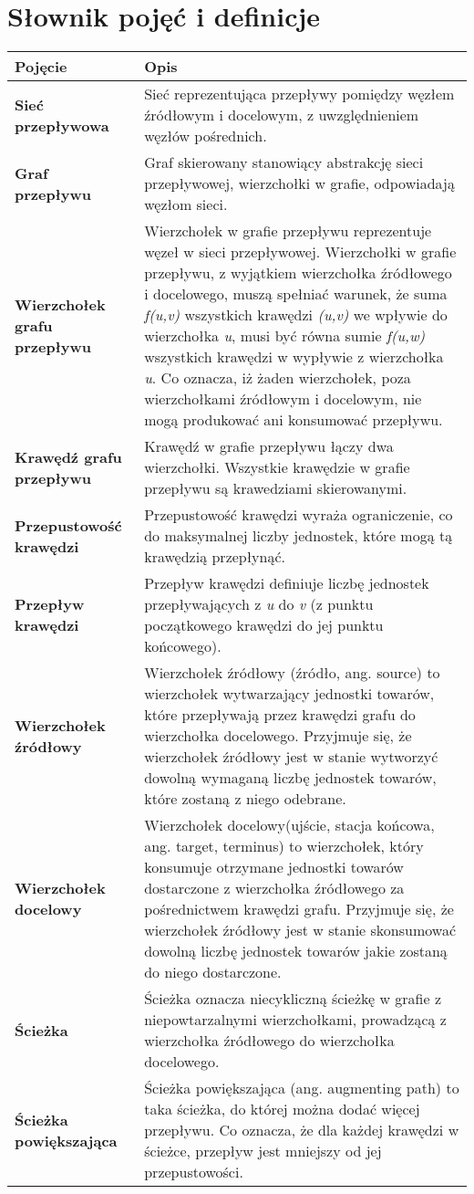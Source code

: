 \documentclass[10pt]{dokument-tiwo}
\begin{document}
\section{Słownik pojęć i definicje}
\begin{longtable}{>{\bfseries}p{} p{}}
Pojęcie & Opis\\
\toprule
Sieć przepływowa  &
Sieć reprezentująca przepływy pomiędzy węzłem źródłowym i docelowym, z uwzględnieniem węzłów pośrednich.\\
\midrule
Graf przepływu &
Graf skierowany stanowiący abstrakcję sieci przepływowej, wierzchołki w grafie, odpowiadają węzłom sieci.\\
\midrule
Wierzchołek grafu przepływu &
Wierzchołek w grafie przepływu reprezentuje węzeł w sieci przepływowej. Wierzchołki w grafie przepływu, z wyjątkiem wierzchołka źródłowego
i docelowego, muszą spełniać warunek, że suma \emph{f(u,v)} wszystkich krawędzi \emph{(u,v)} we wpływie do wierzchołka
\emph{u}, musi być równa sumie \emph{f(u,w)} wszystkich krawędzi w wypływie z wierzchołka \emph{u}. Co oznacza, iż żaden wierzchołek, poza wierzchołkami
źródłowym i docelowym, nie mogą produkować ani konsumować przepływu.\\
\midrule
Krawędź grafu przepływu &
Krawędź w grafie przepływu łączy dwa wierzchołki. Wszystkie krawędzie w grafie przepływu są krawedziami skierowanymi.\\
\midrule
Przepustowość krawędzi &
Przepustowość krawędzi wyraża ograniczenie, co do maksymalnej liczby jednostek, które mogą tą krawędzią przepłynąć.\\
\midrule
Przepływ krawędzi &
Przepływ krawędzi definiuje liczbę jednostek przepływających z \emph{u} do \emph{v} (z punktu początkowego krawędzi do jej punktu końcowego).\\
\midrule
Wierzchołek źródłowy &
Wierzchołek źródłowy (źródło, ang. source) to wierzchołek wytwarzający jednostki towarów, które przepływają przez krawędzi grafu do wierzchołka
docelowego. Przyjmuje się, że wierzchołek źródłowy jest w stanie wytworzyć dowolną wymaganą liczbę jednostek towarów, które zostaną z niego odebrane.\\
\midrule
Wierzchołek docelowy &
Wierzchołek docelowy(ujście, stacja końcowa, ang. target, terminus) to wierzchołek, który konsumuje otrzymane jednostki towarów dostarczone z wierzchołka
źródłowego za pośrednictwem krawędzi grafu. Przyjmuje się, że wierzchołek źródłowy jest w stanie skonsumować dowolną liczbę jednostek towarów jakie zostaną
do niego dostarczone.\\
\midrule
Ścieżka &
Ścieżka oznacza niecykliczną ścieżkę w grafie z niepowtarzalnymi wierzchołkami, prowadzącą z wierzchołka źródłowego do wierzchołka docelowego.\\
\midrule
Ścieżka powiększająca &
Ścieżka powiększająca (ang. augmenting path) to taka ścieżka, do której można dodać więcej przepływu. Co oznacza, że dla każdej krawędzi w ścieżce,
przepływ jest mniejszy od jej przepustowości.\\
\bottomrule
\end{longtable}
\end{document}
